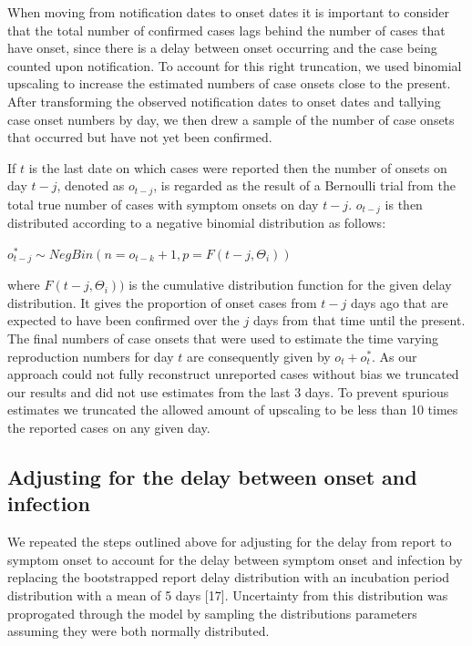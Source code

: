 \documentclass[
]{article}
\begin{document}
When moving from notification dates to onset dates it is important to
consider that the total number of confirmed cases lags behind the number
of cases that have onset, since there is a delay between onset occurring
and the case being counted upon notification. To account for this right
truncation, we used binomial upscaling to increase the estimated numbers
of case onsets close to the present. After transforming the observed
notification dates to onset dates and tallying case onset numbers by
day, we then drew a sample of the number of case onsets that occurred
but have not yet been confirmed.

If \(t\) is the last date on which cases were reported then the number
of onsets on day \(t-j\), denoted as \(o_{t-j}\), is regarded as the
result of a Bernoulli trial from the total true number of cases with
symptom onsets on day \(t - j\). \(o_{t-j}\) is then distributed
according to a negative binomial distribution as follows:

\(o^{*}_{t-j} \sim NegBin(n = o_{t-k} + 1, p = F(t-j, \Theta_i))\)

where \(F(t-j, \Theta_i))\) is the cumulative distribution function for
the given delay distribution. It gives the proportion of onset cases
from \(t-j\) days ago that are expected to have been confirmed over the
\(j\) days from that time until the present. The final numbers of case
onsets that were used to estimate the time varying reproduction numbers
for day \(t\) are consequently given by \(o_t + o^{*}_{t}\). As our
approach could not fully reconstruct unreported cases without bias we
truncated our results and did not use estimates from the last 3 days. To
prevent spurious estimates we truncated the allowed amount of upscaling
to be less than 10 times the reported cases on any given day.

\hypertarget{adjusting-for-the-delay-between-onset-and-infection}{%
\subsection{Adjusting for the delay between onset and
infection}\label{adjusting-for-the-delay-between-onset-and-infection}}

We repeated the steps outlined above for adjusting for the delay from
report to symptom onset to account for the delay between symptom onset
and infection by replacing the bootstrapped report delay distribution
with an incubation period distribution with a mean of 5 days {[}17{]}.
Uncertainty from this distribution was proprogated through the model by
sampling the distributions parameters assuming they were both normally
distributed.
\end{document}
